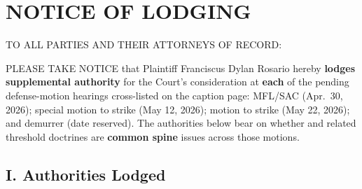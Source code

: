 \newcommand{\docshorttitle}{NTC LODGING SUPPL.\ AUTH.\ --- \S 425.17(c) CROSS-HEARING (CGC-25-631801)}
\newcommand{\doctitleblock}{NOTICE OF LODGING SUPPLEMENTAL AUTHORITY (CODE CIV.\ PROC., \S\S~425.16, 425.17)}
\newcommand{\docsubblock}{(Cal.\ Rules of Court, rule 3.1306(c); lodge only; not an amendment to any pleading)}




\section*{NOTICE OF LODGING}

TO ALL PARTIES AND THEIR ATTORNEYS OF RECORD:

PLEASE TAKE NOTICE that Plaintiff Franciscus Dylan Rosario hereby \textbf{lodges supplemental authority} for the Court's consideration at \textbf{each} of the pending defense-motion hearings cross-listed on the caption page: MFL/SAC (Apr.\ 30, 2026); special motion to strike (May 12, 2026);  motion to strike (May 22, 2026); and demurrer (date reserved). The authorities below bear on whether  and related threshold doctrines are \textbf{common spine} issues across those motions.

\subsection*{I. Authorities Lodged}

